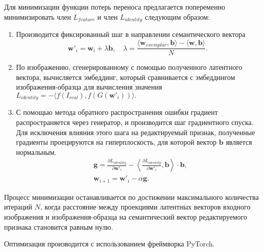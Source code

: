 Для минимизации функции потерь переноса предлагается попеременно минимизировать член $L_{feature}$ и член $L_{identity}$ следующим образом:
\begin{enumerate}
    \item Производится фиксированный шаг в направлении семантического вектора
    $$\mathbf w'_i = \mathbf w_i + \lambda \mathbf b, \quad \lambda = \frac{\langle \mathbf w_{exemplar}, \mathbf b \rangle - \langle \mathbf w, \mathbf b \rangle}{N}.$$
    \item По изображению, сгенерированному с помощью полученного латентного вектора, вычисляется эмбеддинг, который сравнивается с эмбеддингом изображения-образца для вычисления значения
    $L_{identity} = - \langle f(I_{real}), f(G(\mathbf w'_i)) \rangle.$
    \item С помощью метода обратного распространения ошибки градиент распространяется через генератор, и производится шаг градиентного спуска.
    Для исключения влияния этого шага на редактируемый признак, полученные градиенты проецируются на гиперплоскость, для которой вектор $\mathbf b$ является нормальным.
    \begin{align*}
    &\mathbf g = \frac{\partial L_{identity}}{\partial \mathbf w'_i} - \left\langle {\frac{\partial L_{identity}}{\partial \mathbf w'_i} , \mathbf b} \right\rangle \cdot \mathbf b,\\
    &\mathbf w_{i+1} = \mathbf w'_i - \alpha \mathbf g.
    \end{align*}
\end{enumerate}

Процесс минимизации останавливается по достижении максимального количества итераций $N$, когда расстояние между проекциями латентных векторов входного изображения и изображения-образца на семантический вектор редактируемого признака становится равным нулю.

Оптимизация производится с использованием фреймворка PyTorch.
